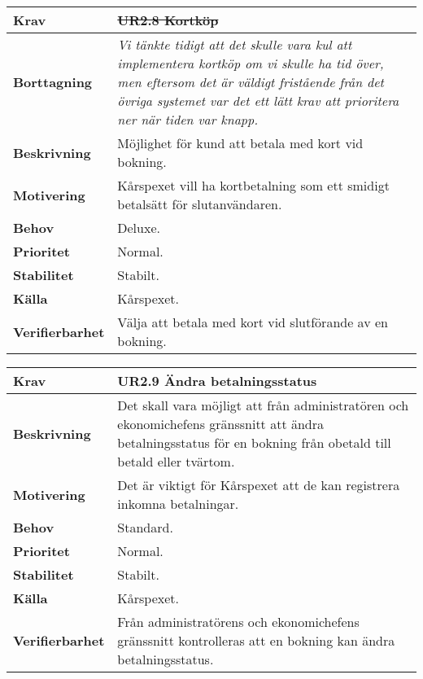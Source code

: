 \documentclass[a4paper, twoside, 11pt, titlepage]{article}
\begin{document}
		\begin {table} [ht] \begin{tabular} { p{2.6cm} p{12.5cm} }
			\hline
			{\sffamily\textbf{Krav}} & {\sffamily\textbf{\sout{UR2.8 Kortköp}}} \\
			\hline
			{\sffamily\textbf{Borttagning}} & {\emph{Vi tänkte tidigt att det skulle vara kul att implementera kortköp om vi skulle ha tid över, men eftersom det är väldigt fristående från det övriga systemet var det ett lätt krav att prioritera ner när tiden var knapp.}} \\
			\hline
			{\sffamily\textbf{Beskrivning}} & {Möjlighet för kund att betala med kort vid bokning.} \\
			\hline
			{\sffamily\textbf{Motivering}} & {Kårspexet vill ha kortbetalning som ett smidigt betalsätt för slutanvändaren.} \\
			\hline
			{\sffamily\textbf{Behov}} & {Deluxe.} \\
			\hline
			{\sffamily\textbf{Prioritet}} & {Normal.} \\
			\hline
			{\sffamily\textbf{Stabilitet}} & {Stabilt.} \\
			\hline
			{\sffamily\textbf{Källa}} & {Kårspexet.} \\
			\hline
			{\sffamily\textbf{Verifierbarhet}} & {Välja att betala med kort vid slutförande av en bokning.} \\
			\hline
		\end{tabular} \end{table} \FloatBarrier
		\vspace{6mm}

		\begin {table} [ht] \begin{tabular} { p{2.6cm} p{12.5cm} }
			\hline
			{\sffamily\textbf{Krav}} & {\sffamily\textbf{UR2.9 Ändra betalningsstatus }} \\
			\hline
			{\sffamily\textbf{Beskrivning}} & {Det skall vara möjligt att från administratören och ekonomichefens gränssnitt att ändra betalningsstatus för en bokning från obetald till betald eller tvärtom.} \\
			\hline
			{\sffamily\textbf{Motivering}} & {Det är viktigt för Kårspexet att de kan registrera inkomna betalningar.} \\
			\hline
			{\sffamily\textbf{Behov}} & {Standard.} \\
			\hline
			{\sffamily\textbf{Prioritet}} & {Normal.} \\
			\hline
			{\sffamily\textbf{Stabilitet}} & {Stabilt.} \\
			\hline
			{\sffamily\textbf{Källa}} & {Kårspexet.} \\
			\hline
			{\sffamily\textbf{Verifierbarhet}} & {Från administratörens och ekonomichefens gränssnitt kontrolleras att en bokning kan ändra betalningsstatus.} \\
			\hline
		\end{tabular} \end{table} \FloatBarrier
		\vspace{6mm}
\end{document}
